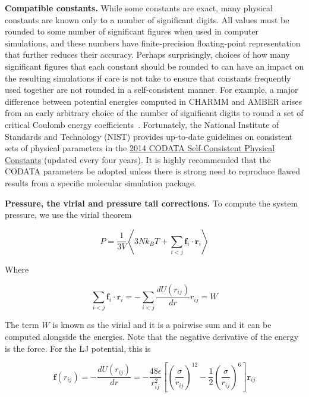 \documentclass[aip,jcp,preprint,superscriptaddress,floatfix]{revtex4-1}
\begin{document}
\textbf{Compatible constants.}
While some constants are exact, many physical constants are known only to a number of significant digits.
All values must be rounded to some number of significant figures when used in computer simulations, and these numbers have finite-precision floating-point representation that further reduces their accuracy.
Perhaps surprisingly, choices of how many significant figures that each constant should be rounded to can have an impact on the resulting simulations if care is not take to ensure that constants frequently used together are not rounded in a self-consistent manner.
For example, a major difference between potential energies computed in CHARMM and AMBER arises from an early arbitrary choice of the number of significant digits to round a set of critical Coulomb energy coefficients~\cite{Shirts.JCAMD.31.147.2017}.
Fortunately, the National Institute of Standards and Technology (NIST) provides up-to-date guidelines on consistent sets of physical parameters in the \href{http://ws680.nist.gov/publication/get_pdf.cfm?pub_id=920686}{2014 CODATA Self-Consistent Physical Constants} (updated every four years).
It is highly recommended that the CODATA parameters be adopted unless there is strong need to reproduce flawed results from a specific molecular simulation package.


\textbf{Pressure, the virial and pressure tail corrections.} To compute the system pressure,
we use the virial theorem

\begin{equation}
        P = \frac{1}{3V} \left< 3 N k_B T + \sum_{i < j} \textbf{f}_i \cdot \textbf{r}_i  \right>
\end{equation}

Where

\begin{equation}
        \sum_{i < j} \textbf{f}_i \cdot \textbf{r}_i = - \sum_{i < j} \frac{dU\left(r_{ij} \right)}{dr} r_{ij} = W
\end{equation}

The term $W$ is known as the virial and it is a pairwise sum and it can be computed
alongside the energies. Note that the negative derivative of the energy is the force.
For the LJ potential, this is

\begin{equation}
        \mathbf{f}\left(r_{ij} \right) = -\frac{dU \left(r_{ij} \right)}{dr} = - \frac{48 \epsilon}{r^2_{ij}} \left[\left(\frac{\sigma}{r_{ij}}\right)^{12} -\frac{1}{2}\left(\frac{\sigma}{r_{ij}}\right)^{6} \right] \mathbf{r}_{ij}
\end{equation}
\end{document}
